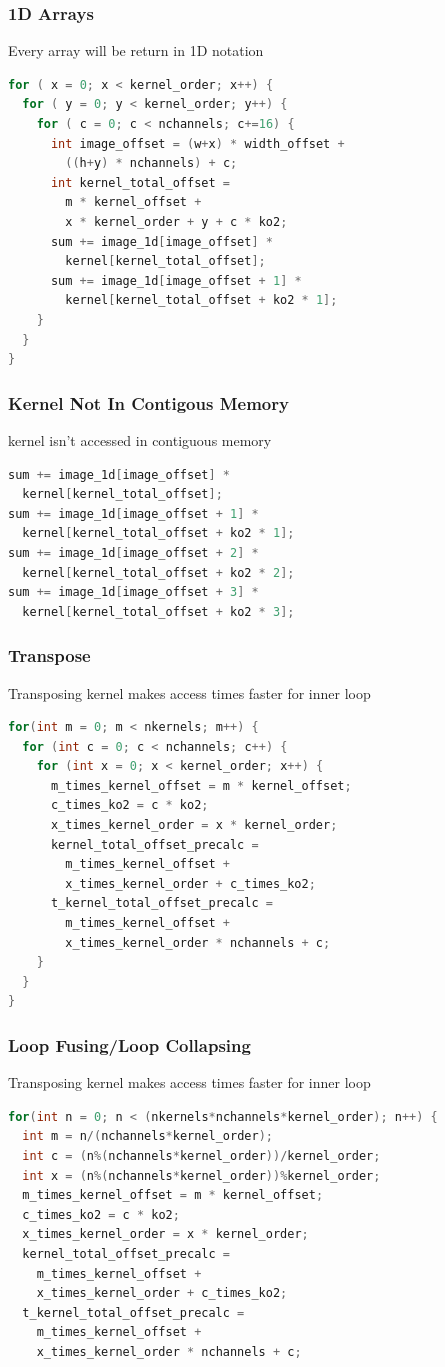 \documentclass{beamer}
\begin{document}
\begin{frame}[fragile]
\frametitle{1D Arrays}
Every array will be return in 1D notation 
\begin{lstlisting}[language=C,keywordstyle=\color{blue}]
for ( x = 0; x < kernel_order; x++) {
  for ( y = 0; y < kernel_order; y++) {
    for ( c = 0; c < nchannels; c+=16) {
      int image_offset = (w+x) * width_offset + 
        ((h+y) * nchannels) + c;
      int kernel_total_offset = 
        m * kernel_offset + 
        x * kernel_order + y + c * ko2;
      sum += image_1d[image_offset] * 
        kernel[kernel_total_offset];
      sum += image_1d[image_offset + 1] * 
        kernel[kernel_total_offset + ko2 * 1];
    }
  }
}
\end{lstlisting}
\end{frame}

\begin{frame}[fragile]
\frametitle{Kernel Not In Contigous Memory}
kernel isn't accessed in contiguous memory
\begin{lstlisting}[language=C,keywordstyle=\color{blue}]
sum += image_1d[image_offset] * 
  kernel[kernel_total_offset];
sum += image_1d[image_offset + 1] * 
  kernel[kernel_total_offset + ko2 * 1];
sum += image_1d[image_offset + 2] * 
  kernel[kernel_total_offset + ko2 * 2];
sum += image_1d[image_offset + 3] * 
  kernel[kernel_total_offset + ko2 * 3];
\end{lstlisting}
\end{frame}

\begin{frame}[fragile]
\frametitle{Transpose}
Transposing kernel makes access times faster for inner loop
\begin{lstlisting}[language=C,keywordstyle=\color{blue}]
for(int m = 0; m < nkernels; m++) {
  for (int c = 0; c < nchannels; c++) {
    for (int x = 0; x < kernel_order; x++) {
      m_times_kernel_offset = m * kernel_offset;
      c_times_ko2 = c * ko2;
      x_times_kernel_order = x * kernel_order;
      kernel_total_offset_precalc = 
        m_times_kernel_offset + 
        x_times_kernel_order + c_times_ko2;
      t_kernel_total_offset_precalc = 
        m_times_kernel_offset + 
        x_times_kernel_order * nchannels + c;
    }
  } 
}
\end{lstlisting}
\end{frame}

\begin{frame}[fragile]
\frametitle{Loop Fusing/Loop Collapsing}
Transposing kernel makes access times faster for inner loop
\begin{lstlisting}[language=C,keywordstyle=\color{blue}]
for(int n = 0; n < (nkernels*nchannels*kernel_order); n++) {
  int m = n/(nchannels*kernel_order);
  int c = (n%(nchannels*kernel_order))/kernel_order; 
  int x = (n%(nchannels*kernel_order))%kernel_order; 
  m_times_kernel_offset = m * kernel_offset;
  c_times_ko2 = c * ko2;
  x_times_kernel_order = x * kernel_order;
  kernel_total_offset_precalc = 
    m_times_kernel_offset + 
    x_times_kernel_order + c_times_ko2;
  t_kernel_total_offset_precalc = 
    m_times_kernel_offset + 
    x_times_kernel_order * nchannels + c;
\end{lstlisting}
\end{frame}
\end{document}
